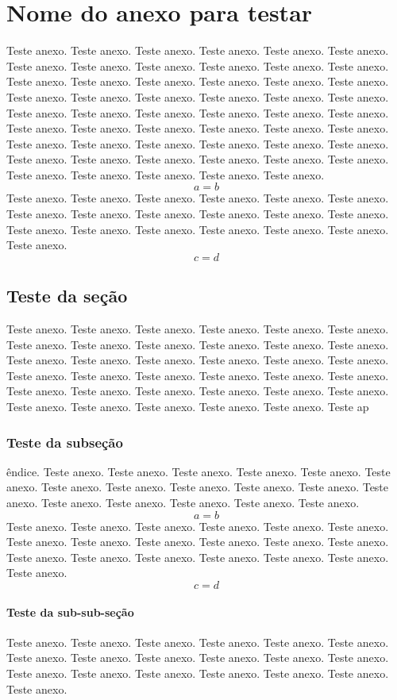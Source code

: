 
\chapter{Nome do anexo para testar}

Teste anexo. Teste anexo. Teste anexo. Teste anexo. Teste anexo. Teste anexo. Teste anexo. Teste anexo. Teste anexo. Teste anexo. Teste anexo. Teste anexo. Teste anexo. Teste anexo. Teste anexo. Teste anexo. Teste anexo. Teste anexo. Teste anexo. Teste anexo. Teste anexo. Teste anexo. Teste anexo. Teste anexo. Teste anexo. Teste anexo. Teste anexo. Teste anexo. Teste anexo. Teste anexo. Teste anexo. Teste anexo. Teste anexo. Teste anexo. Teste anexo. Teste anexo. Teste anexo. Teste anexo. Teste anexo. Teste anexo. Teste anexo. Teste anexo. Teste anexo. Teste anexo. Teste anexo. Teste anexo. Teste anexo. Teste anexo. Teste anexo. Teste anexo. Teste anexo. Teste anexo. Teste anexo. 
\begin{equation}
a = b
\end{equation}
Teste anexo. Teste anexo. Teste anexo. Teste anexo. Teste anexo. Teste anexo. Teste anexo. Teste anexo. Teste anexo. Teste anexo. Teste anexo. Teste anexo. Teste anexo. Teste anexo. Teste anexo. Teste anexo. Teste anexo. Teste anexo. Teste anexo. 
\begin{equation}
c=d
\end{equation}

\section{Teste da seção}
Teste anexo. Teste anexo. Teste anexo. Teste anexo. Teste anexo. Teste anexo. Teste anexo. Teste anexo. Teste anexo. Teste anexo. Teste anexo. Teste anexo. Teste anexo. Teste anexo. Teste anexo. Teste anexo. Teste anexo. Teste anexo. Teste anexo. Teste anexo. Teste anexo. Teste anexo. Teste anexo. Teste anexo. Teste anexo. Teste anexo. Teste anexo. Teste anexo. Teste anexo. Teste anexo. Teste anexo. Teste anexo. Teste anexo. Teste anexo. Teste anexo. Teste ap
\subsection{Teste da subseção}
\^endice. Teste anexo. Teste anexo. Teste anexo. Teste anexo. Teste anexo. Teste anexo. Teste anexo. Teste anexo. Teste anexo. Teste anexo. Teste anexo. Teste anexo. Teste anexo. Teste anexo. Teste anexo. Teste anexo. Teste anexo. 
\begin{equation}
a = b
\end{equation}
Teste anexo. Teste anexo. Teste anexo. Teste anexo. Teste anexo. Teste anexo. Teste anexo. Teste anexo. Teste anexo. Teste anexo. Teste anexo. Teste anexo. Teste anexo. Teste anexo. Teste anexo. Teste anexo. Teste anexo. Teste anexo. Teste anexo. 
\begin{equation}
c=d
\end{equation}
\subsubsection{Teste da sub-sub-seção}
Teste anexo. Teste anexo. Teste anexo. Teste anexo. Teste anexo. Teste anexo. Teste anexo. Teste anexo. Teste anexo. Teste anexo. Teste anexo. Teste anexo. Teste anexo. Teste anexo. Teste anexo. Teste anexo. Teste anexo. Teste anexo. Teste anexo. 


